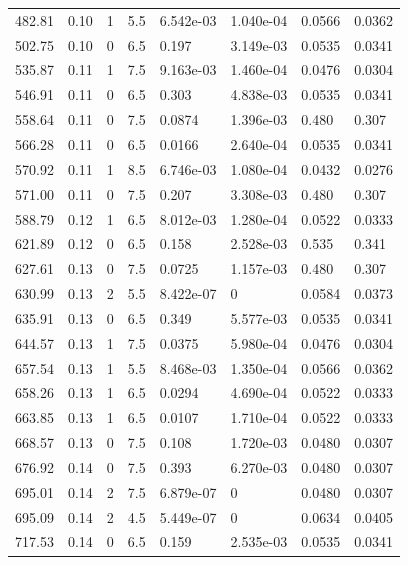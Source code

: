 \documentclass[preview]{standalone}
\begin{document}
{{{\begin{tabular}{L{1.2cm}C{1.2cm} C{0.3cm}C{0.5cm} C{1.4cm}C{1.4cm} C{1.4cm}C{1.4cm}}
  482.81  &  0.10  & 1     & 5.5 &  6.542e-03  & 1.040e-04  & 0.0566 &  0.0362   \\ 
  502.75  &  0.10  & 0     & 6.5 &  0.197  & 3.149e-03  & 0.0535 &  0.0341   \\ 
  535.87  &  0.11  & 1     & 7.5 &  9.163e-03  & 1.460e-04  & 0.0476 &  0.0304   \\ 
  546.91  &  0.11  & 0     & 6.5 &  0.303  & 4.838e-03  & 0.0535 &  0.0341   \\ 
  558.64  &  0.11  & 0     & 7.5 &  0.0874  & 1.396e-03  & 0.480 &  0.307   \\ 
  566.28  &  0.11  & 0     & 6.5 &  0.0166  & 2.640e-04  & 0.0535 &  0.0341   \\ 
  570.92  &  0.11  & 1     & 8.5 &  6.746e-03  & 1.080e-04  & 0.0432 &  0.0276   \\ 
  571.00  &  0.11  & 0     & 7.5 &  0.207  & 3.308e-03  & 0.480 &  0.307   \\ 
  588.79  &  0.12  & 1     & 6.5 &  8.012e-03  & 1.280e-04  & 0.0522 &  0.0333   \\ 
  621.89  &  0.12  & 0     & 6.5 &  0.158  & 2.528e-03  & 0.535 &  0.341   \\ 
  627.61  &  0.13  & 0     & 7.5 &  0.0725  & 1.157e-03  & 0.480 &  0.307   \\ 
  630.99  &  0.13  & 2     & 5.5 &  8.422e-07  & 0  & 0.0584 &  0.0373   \\ 
  635.91  &  0.13  & 0     & 6.5 &  0.349  & 5.577e-03  & 0.0535 &  0.0341   \\ 
  644.57  &  0.13  & 1     & 7.5 &  0.0375  & 5.980e-04  & 0.0476 &  0.0304   \\ 
  657.54  &  0.13  & 1     & 5.5 &  8.468e-03  & 1.350e-04  & 0.0566 &  0.0362   \\ 
  658.26  &  0.13  & 1     & 6.5 &  0.0294  & 4.690e-04  & 0.0522 &  0.0333   \\ 
  663.85  &  0.13  & 1     & 6.5 &  0.0107  & 1.710e-04  & 0.0522 &  0.0333   \\ 
  668.57  &  0.13  & 0     & 7.5 &  0.108  & 1.720e-03  & 0.0480 &  0.0307   \\ 
  676.92  &  0.14  & 0     & 7.5 &  0.393  & 6.270e-03  & 0.0480 &  0.0307   \\ 
  695.01  &  0.14  & 2     & 7.5 &  6.879e-07  & 0  & 0.0480 &  0.0307   \\ 
  695.09  &  0.14  & 2     & 4.5 &  5.449e-07  & 0  & 0.0634 &  0.0405   \\ 
  717.53  &  0.14  & 0     & 6.5 &  0.159  & 2.535e-03  & 0.0535 &  0.0341   \\ 

\end{tabular}}}}
\end{document}
